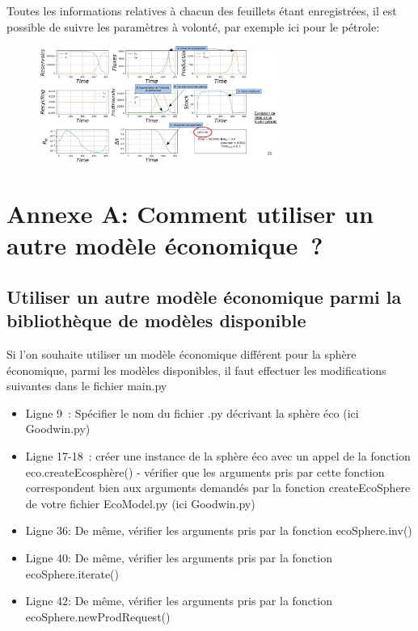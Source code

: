\documentclass[12pt,a4paper]{article}%
\begin{document}
Toutes les informations relatives à chacun des feuillets étant
enregistrées, il est possible de suivre les paramètres à volonté, par
exemple ici pour le pétrole:

\begin{figure}[h]
\centering\includegraphics[width=0.7\textwidth]{figures/ResultatSimulPet.jpg}
\end{figure}

\newpage

\section{Annexe A: Comment utiliser un autre modèle économique~?}

\subsection{Utiliser un autre modèle économique parmi la bibliothèque
de modèles disponible}

Si l'on souhaite utiliser un modèle économique différent pour la
sphère économique, parmi les modèles disponibles, il faut effectuer
les modifications suivantes dans le fichier main.py

\begin{itemize}
\item Ligne 9~: Spécifier le nom du fichier .py décrivant la sphère éco
(ici Goodwin.py)

\item Ligne 17-18~: créer une instance de la sphère éco avec un appel de
la fonction eco.createEcosphère() - vérifier que les arguments pris par
cette fonction correspondent bien aux arguments demandés par la fonction
createEcoSphere de votre fichier EcoModel.py (ici Goodwin.py)

\item Ligne 36: De même, vérifier les arguments pris par la fonction ecoSphere.inv()

\item Ligne 40: De même, vérifier les arguments pris par la fonction ecoSphere.iterate()

\item Ligne 42: De même, vérifier les arguments pris par la fonction ecoSphere.newProdRequest()
\end{itemize}
\end{document}
